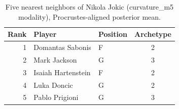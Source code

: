 \begin{table}[htbp]
  \centering\small
  \begin{tabular}{rllc}
    \toprule
    Rank & Player & Position & Archetype \\
    \midrule
    1 & Domantas Sabonis & F & 2 \\
    2 & Mark Jackson & G & 3 \\
    3 & Isaiah Hartenstein & F & 2 \\
    4 & Luka Doncic & G & 2 \\
    5 & Pablo Prigioni & G & 3 \\
    \bottomrule
  \end{tabular}
  \caption{Five nearest neighbors of Nikola Jokic (curvature_m5 modality), Procrustes-aligned posterior mean.}
  \label{tab:Nikola_Jokic_neighbors_curvature_m5}
\end{table}

